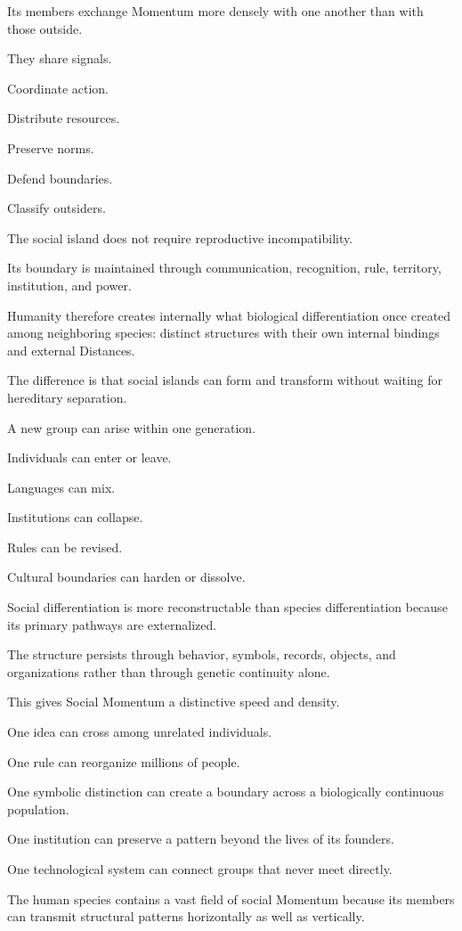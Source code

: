 Its members exchange Momentum more densely with one another than with those outside.

They share signals.

Coordinate action.

Distribute resources.

Preserve norms.

Defend boundaries.

Classify outsiders.

The social island does not require reproductive incompatibility.

Its boundary is maintained through communication, recognition, rule, territory, institution, and power.

Humanity therefore creates internally what biological differentiation once created among neighboring species: distinct structures with their own internal bindings and external Distances.

The difference is that social islands can form and transform without waiting for hereditary separation.

A new group can arise within one generation.

Individuals can enter or leave.

Languages can mix.

Institutions can collapse.

Rules can be revised.

Cultural boundaries can harden or dissolve.

Social differentiation is more reconstructable than species differentiation because its primary pathways are externalized.

The structure persists through behavior, symbols, records, objects, and organizations rather than through genetic continuity alone.

This gives Social Momentum a distinctive speed and density.

One idea can cross among unrelated individuals.

One rule can reorganize millions of people.

One symbolic distinction can create a boundary across a biologically continuous population.

One institution can preserve a pattern beyond the lives of its founders.

One technological system can connect groups that never meet directly.

The human species contains a vast field of social Momentum because its members can transmit structural patterns horizontally as well as vertically.

